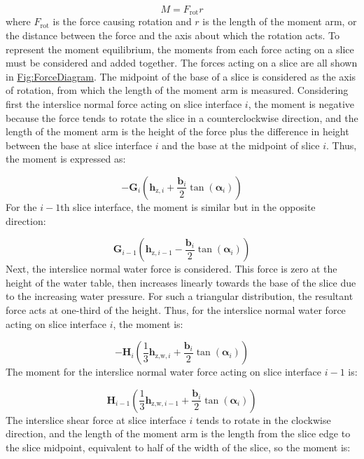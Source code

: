 \documentclass[12pt]{article}
\begin{document}
\begin{displaymath}
M={F_{\text{rot}}} r
\end{displaymath}
where ${F_{\text{rot}}}$ is the force causing rotation and $r$ is the length of the moment arm, or the distance between the force and the axis about which the rotation acts. To represent the moment equilibrium, the moments from each force acting on a slice must be considered and added together. The forces acting on a slice are all shown in \hyperref[Figure:ForceDiagram]{Fig:ForceDiagram}. The midpoint of the base of a slice is considered as the axis of rotation, from which the length of the moment arm is measured. Considering first the interslice normal force acting on slice interface $i$, the moment is negative because the force tends to rotate the slice in a counterclockwise direction, and the length of the moment arm is the height of the force plus the difference in height between the base at slice interface $i$ and the base at the midpoint of slice $i$. Thus, the moment is expressed as:

\begin{displaymath}
-{\symbf{G}}_{i} \left({\symbf{h}_{\text{z},i}}+\frac{{\symbf{b}}_{i}}{2} \tan\left({\symbf{α}}_{i}\right)\right)
\end{displaymath}
For the $i-1$th slice interface, the moment is similar but in the opposite direction:

\begin{displaymath}
{\symbf{G}}_{i-1} \left({\symbf{h}_{\text{z},i-1}}-\frac{{\symbf{b}}_{i}}{2} \tan\left({\symbf{α}}_{i}\right)\right)
\end{displaymath}
Next, the interslice normal water force is considered. This force is zero at the height of the water table, then increases linearly towards the base of the slice due to the increasing water pressure. For such a triangular distribution, the resultant force acts at one-third of the height. Thus, for the interslice normal water force acting on slice interface $i$, the moment is:

\begin{displaymath}
-{\symbf{H}}_{i} \left(\frac{1}{3} {\symbf{h}_{\text{z,w},i}}+\frac{{\symbf{b}}_{i}}{2} \tan\left({\symbf{α}}_{i}\right)\right)
\end{displaymath}
The moment for the interslice normal water force acting on slice interface $i-1$ is:

\begin{displaymath}
{\symbf{H}}_{i-1} \left(\frac{1}{3} {\symbf{h}_{\text{z,w},i-1}}+\frac{{\symbf{b}}_{i}}{2} \tan\left({\symbf{α}}_{i}\right)\right)
\end{displaymath}
The interslice shear force at slice interface $i$ tends to rotate in the clockwise direction, and the length of the moment arm is the length from the slice edge to the slice midpoint, equivalent to half of the width of the slice, so the moment is:
\end{document}

